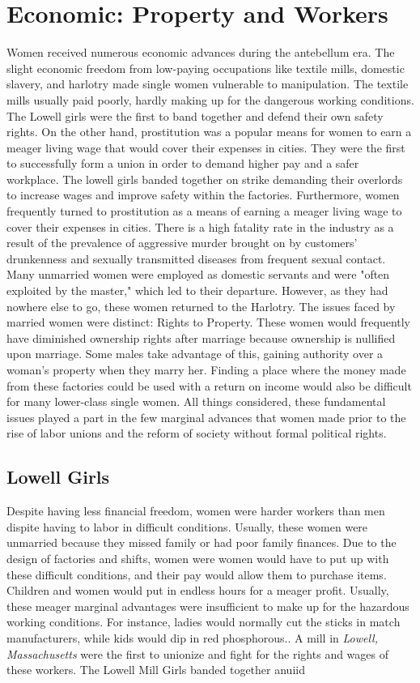 \documentclass{article}
\begin{document}
\section{Economic: Property and Workers}
Women received numerous economic advances during the antebellum era. The slight economic freedom from low-paying occupations like textile mills, domestic slavery, and harlotry made single women vulnerable to manipulation. The textile mills usually paid poorly, hardly making up for the dangerous working conditions. The Lowell girls were the first to band together and defend their own safety rights. On the other hand, prostitution was a popular means for women to earn a meager living wage that would cover their expenses in cities. They were the first to successfully form a union in order to demand higher pay and a safer workplace. The lowell girls banded together on strike demanding their overlords to increase wages and improve safety within the factories. Furthermore, women frequently turned to prostitution as a means of earning a meager living wage to cover their expenses in cities. There is a high fatality rate in the industry as a result of the prevalence of aggressive murder brought on by customers' drunkenness and sexually transmitted diseases from frequent sexual contact. Many unmarried women were employed as domestic servants and were "often exploited by the master,"\parencite{henretta} which led to their departure. However, as they had nowhere else to go, these women returned to the Harlotry. The issues faced by married women were distinct: Rights to Property. These women would frequently have diminished ownership rights after marriage because ownership is nullified upon marriage. Some males take advantage of this, gaining authority over a woman's property when they marry her. Finding a place where the money made from these factories could be used with a return on income would also be difficult for many lower-class single women. All things considered, these fundamental issues played a part in the few marginal advances that women made prior to the rise of labor unions and the reform of society without formal political rights.
\subsection{Lowell Girls}
Despite having less financial freedom, women were harder workers than men dispite having to labor in difficult conditions. Usually, these women were unmarried because they missed family or had poor family finances. Due to the design of factories and shifts, women were  women would have to put up with these difficult conditions, and their pay would allow them to purchase items. Children and women would put in endless hours for a meager profit. Usually, these meager marginal advantages were insufficient to make up for the hazardous working conditions. For instance, ladies would normally cut the sticks in match manufacturers, while kids would dip in red phosphorous.\citep[117]{stansell1982}. A mill in \emph{Lowell, Massachusetts} were the first to unionize and fight for the rights and wages of these workers. The Lowell Mill Girls banded together anuiid
\end{document}
